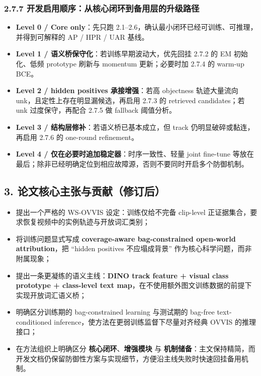 \documentclass[UTF8]{ctexart}
\begin{document}
\subsubsection*{2.7.7 开发启用顺序：从核心闭环到备用层的升级路径}
\begin{itemize}
\item \textbf{Level 0 / Core only}：先只跑 2.1--2.6，确认最小闭环已经可训练、可推理，并得到可解释的 AP / HPR / UAR 基线。
\item \textbf{Level 1 / 语义桥保守化}：若训练早期波动大，优先回挂 2.7.2 的 EM 初始化、低频 prototype 刷新与 momentum 更新；必要时加 2.7.4 的 warm-up BCE。
\item \textbf{Level 2 / hidden positives 承接增强}：若高 objectness 轨迹大量流向 unk，且定性上存在明显漏候选，再启用 2.7.3 的 retrieved candidates；若 unk 过度保守，再配合 2.7.5 做 fallback 阈值分析。
\item \textbf{Level 3 / 结构层修补}：若语义桥已基本成立，但 track 仍明显破碎或黏连，再启用 2.7.6 的 one-round refinement。
\item \textbf{Level 4 / 仅在必要时追加稳定器}：时序一致性、轻量 joint fine-tune 等放在最后；除非已经明确定位到相应故障源，否则不要同时开启多个防御机制。
\end{itemize}

\par\noindent\hrulefill\par

\subsection*{3. 论文核心主张与贡献（修订后）}
\begin{itemize}
\item 提出一个严格的 WS-OVVIS 设定：训练仅给不完备 clip-level 正证据集合，要求恢复视频中的实例轨迹与开放词汇类别；
\item 将训练问题显式写成 \textbf{coverage-aware bag-constrained open-world attribution}，把 ``hidden positives 不应塌成背景'' 作为核心科学问题，而非附属现象；
\item 提出一条更凝练的语义主线：\textbf{DINO track feature + visual class prototype + class-level text map}，在不使用额外图文训练数据的前提下实现开放词汇语义桥；
\item 明确区分训练期的 bag-constrained learning 与测试期的 bag-free text-conditioned inference，使方法在更弱训练监督下尽量对齐经典 OVVIS 的推理接口；
\item 在方法组织上明确区分 \textbf{核心闭环}、\textbf{增强模块} 与 \textbf{机制储备}：主文保持精简，而开发文档仍保留防御性方案与实现细节，方便沿主线失败时快速回挂备用机制。
\end{itemize}
\end{document}
